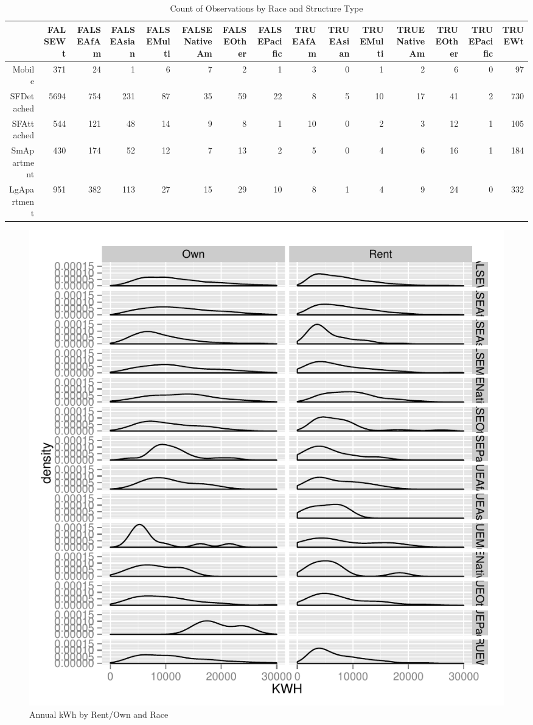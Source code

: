 \documentclass{article}
\begin{document}
\begin{table}[ht]
\centering
\begin{tabular}{rrrrrrrrrrrrrrr}
  \hline
 & FALSEWt & FALSEAfAm & FALSEAsian & FALSEMulti & FALSENativeAm & FALSEOther & FALSEPacific & TRUEAfAm & TRUEAsian & TRUEMulti & TRUENativeAm & TRUEOther & TRUEPacific & TRUEWt \\ 
  \hline
Mobile & 371 &  24 &   1 &   6 &   7 &   2 &   1 &   3 &   0 &   1 &   2 &   6 &   0 &  97 \\ 
  SFDetached & 5694 & 754 & 231 &  87 &  35 &  59 &  22 &   8 &   5 &  10 &  17 &  41 &   2 & 730 \\ 
  SFAttached & 544 & 121 &  48 &  14 &   9 &   8 &   1 &  10 &   0 &   2 &   3 &  12 &   1 & 105 \\ 
  SmApartment & 430 & 174 &  52 &  12 &   7 &  13 &   2 &   5 &   0 &   4 &   6 &  16 &   1 & 184 \\ 
  LgApartment & 951 & 382 & 113 &  27 &  15 &  29 &  10 &   8 &   1 &   4 &   9 &  24 &   0 & 332 \\ 
   \hline
\end{tabular}
\caption{Count of Observations by Race and Structure Type} 
\label{tab:RaceVStruct}
\end{table}
\begin{figure}
\begin{center}
\caption{Annual kWh by Rent/Own and Race}
\label{fig:kWhbyOwnRace}
\includegraphics{DraftEdwardsWoods-004}
\end{center}
\end{figure}
\end{document}
